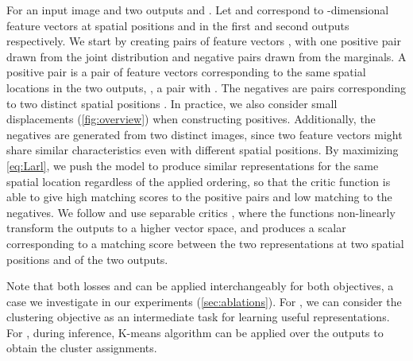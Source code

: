 For an input image 
and two outputs  and . Let 
 and  correspond to -dimensional
feature vectors at spatial positions  and
 in the first and second outputs respectively.
We start by creating  pairs of feature vectors ,
with one positive pair drawn from the joint distribution and  negative pairs drawn from the marginals.
A positive pair is a pair of feature vectors corresponding to the same
spatial locations in the two outputs,
\ie, a pair  with . The negatives 
are pairs  corresponding to two distinct
spatial positions .
In practice, we also consider small displacements  (\cref{fig:overview}) when constructing positives.
Additionally, the negatives are generated from two distinct images, since
two feature vectors might share similar characteristics even with different spatial positions.
By maximizing \cref{eq:Larl}, we push the model  to produce similar representations for the same
spatial location regardless of the applied ordering, so that the critic 
function  is able to give high matching scores to the positive pairs and low matching to the negatives.
We follow \cite{infomax} and use separable
critics , where the functions 
 non-linearly transform the outputs to a higher vector space, and 
 produces a scalar corresponding to a matching score between
the two representations at two spatial positions  and  of the two outputs.

Note that both losses  and  can be applied
interchangeably for both objectives, a case we investigate in our experiments (\cref{sec:ablations}).
For , we can consider the clustering objective as an
intermediate task for learning useful representations.
For , during inference, K-means \cite{JDH17} algorithm
can be applied over the outputs to obtain the cluster assignments.



































